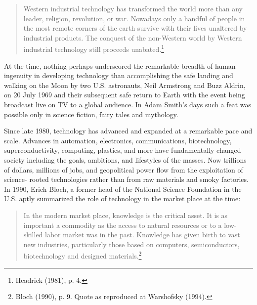 \begin{multicols}{2}
\begin{quote}
Western industrial technology has transformed the world more than any leader, religion, revolution, or war. Nowadays only a handful of people in the most remote corners of the earth survive with their lives unaltered by industrial products. The conquest of the non-Western world by Western industrial technology still proceeds unabated.\footnote{Headrick (1981), p. 4.}
\end{quote}
\smallskip

At the time, nothing perhaps underscored the remarkable breadth of human ingenuity in developing technology than accomplishing the safe landing and walking on the Moon by two U.S. astronauts, Neil Armstrong and Buzz Aldrin, on 20 July 1969 and their subsequent safe return to Earth with the event being broadcast live on TV to a global audience. In Adam Smith's days such a feat was possible only in science fiction, fairy tales and mythology.

Since late 1980, technology has advanced and expanded at a remarkable pace and scale. Advances in automation, electronics, communications, biotechnology, superconductivity, computing, plastics, and more have fundamentally changed society including the goals, ambitions, and lifestyles of the masses. Now trillions of dollars, millions of jobs, and geopolitical power flow from the exploitation of science- rooted technologies rather than from raw materials and smoky factories. In 1990, Erich Bloch, a former head of the National Science Foundation in the U.S. aptly summarized the role of technology in the market place at the time:
\smallskip

\begin{quote}
In the modern market place, knowledge is the critical asset. It is as important a commodity as the access to natural resources or to a low-skilled labor market was in the past. Knowledge has given birth to vast new industries, particularly those based on computers, semiconductors, biotechnology and designed materials.\footnote{Bloch (1990), p. 9. Quote as reproduced at Warshofsky (1994).}
\end{quote}


\end{multicols}
